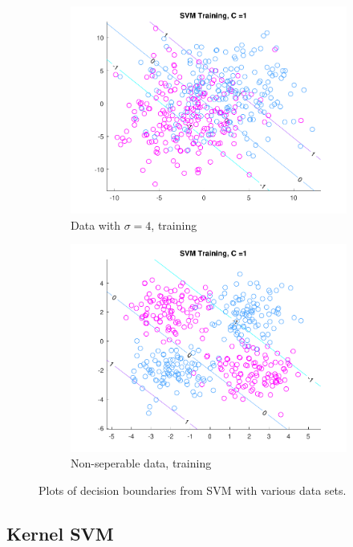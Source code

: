 \begin{figure}[h!]
\begin{subfigure}[b]{0.4\textwidth}
	\includegraphics[scale=0.4]{figures/hw2_2_stdev4_a_1.pdf}
	\caption{Data with $\sigma = 4$, training}\label{fig:svm_data_stdev4a}
    \end{subfigure}  
    \begin{subfigure}[b]{0.4\textwidth}
	\includegraphics[scale=0.4]{figures/hw2_2_nonsep_a_1.pdf}
	\caption{Non-seperable data, training}\label{fig:svm_data_nonsep_a}
    \end{subfigure}  
    \caption{Plots of decision boundaries from SVM with various data sets.}  \label{fig:LR_plots}  
\end{figure}

\subsection{Kernel SVM}

